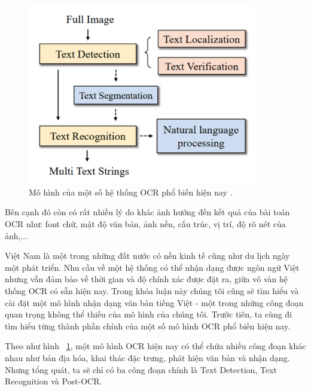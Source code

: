 \begin{figure}
\centering
\includegraphics[width=0.9\textwidth]{mep_img/typeofproblem.jpg}
\caption{Mô hình của một số hệ thống OCR phổ biến hiện nay \cite{ocr_struct}. }\label{fig_2.2}
\end{figure}

Bên cạnh đó còn có rất nhiều lý do khác ảnh hưởng đến kết quả của bài toán OCR như:
font chữ, mật độ văn bản, ảnh nền, cấu trúc, vị trí, độ rõ nét của ảnh,...

Việt Nam là một trong những đất nước có nền kinh tế cũng như du lịch ngày một phát triển.
Nhu cầu về một hệ thống có thể nhận dạng được ngôn ngữ Việt nhưng vẫn đảm bảo về thời
gian và độ chính xác được đặt ra, giữa vô vàn hệ thống OCR có sẵn hiện nay. Trong khóa
luận này chúng tôi cũng sẽ tìm hiểu và cài đặt một mô hình nhận dạng văn bản tiếng Việt - một trong
những công đoạn quan trọng không thể thiếu của mô hình của chúng tôi. Trước tiên, ta cùng
đi tìm hiểu từng thành phần chính của một số mô hình OCR phổ biến hiện nay.



Theo như hình ~\ref{fig_2.2}, một mô hình OCR hiện nay có thể chứa nhiều công đoạn khác nhau như bản địa hóa, khai
thác đặc trưng, phát hiện văn bản và nhận dạng. Nhưng tổng quát, ta sẽ chỉ có ba công
đoạn chính là Text Detection, Text Recognition và Post-OCR.

